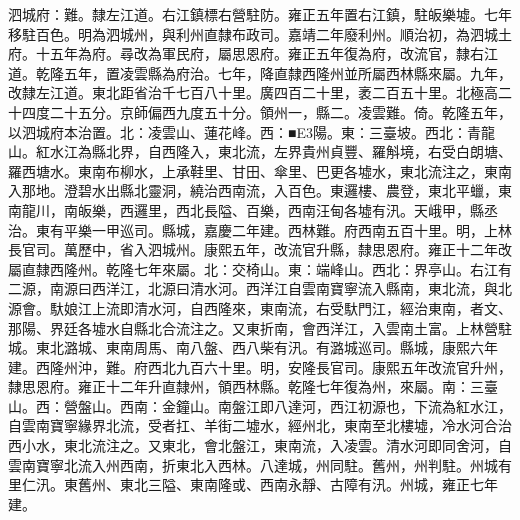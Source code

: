 \begin{pinyinscope}
泗城府：難。隸左江道。右江鎮標右營駐防。雍正五年置右江鎮，駐皈樂墟。七年移駐百色。明為泗城州，與利州直隸布政司。嘉靖二年廢利州。順治初，為泗城土府。十五年為府。尋改為軍民府，屬思恩府。雍正五年復為府，改流官，隸右江道。乾隆五年，置凌雲縣為府治。七年，降直隸西隆州並所屬西林縣來屬。九年，改隸左江道。東北距省治千七百八十里。廣四百二十里，袤二百五十里。北極高二十四度二十五分。京師偏西九度五十分。領州一，縣二。凌雲難。倚。乾隆五年，以泗城府本治置。北：凌雲山、蓮花峰。西：■E3陽。東：三臺坡。西北：青龍山。紅水江為縣北界，自西隆入，東北流，左界貴州貞豐、羅斛境，右受白朗塘、羅西塘水。東南布柳水，上承鞋里、甘田、傘里、巴更各墟水，東北流注之，東南入那地。澄碧水出縣北靈洞，繞治西南流，入百色。東邏樓、農登，東北平蠟，東南龍川，南皈樂，西邏里，西北長隘、百樂，西南汪甸各墟有汛。天峨甲，縣丞治。東有平樂一甲巡司。縣城，嘉慶二年建。西林難。府西南五百十里。明，上林長官司。萬歷中，省入泗城州。康熙五年，改流官升縣，隸思恩府。雍正十二年改屬直隸西隆州。乾隆七年來屬。北：交椅山。東：端峰山。西北：界亭山。右江有二源，南源曰西洋江，北源曰清水河。西洋江自雲南寶寧流入縣南，東北流，與北源會。馱娘江上流即清水河，自西隆來，東南流，右受馱門江，經治東南，者文、那陽、界廷各墟水自縣北合流注之。又東折南，會西洋江，入雲南土富。上林營駐城。東北潞城、東南周馬、南八盤、西八柴有汛。有潞城巡司。縣城，康熙六年建。西隆州沖，難。府西北九百六十里。明，安隆長官司。康熙五年改流官升州，隸思恩府。雍正十二年升直隸州，領西林縣。乾隆七年復為州，來屬。南：三臺山。西：營盤山。西南：金鐘山。南盤江即八達河，西江初源也，下流為紅水江，自雲南寶寧緣界北流，受者扛、羊街二墟水，經州北，東南至北樓墟，冷水河合治西小水，東北流注之。又東北，會北盤江，東南流，入凌雲。清水河即同舍河，自雲南寶寧北流入州西南，折東北入西林。八達城，州同駐。舊州，州判駐。州城有里仁汛。東舊州、東北三隘、東南隆或、西南永靜、古障有汛。州城，雍正七年建。


\end{pinyinscope}
